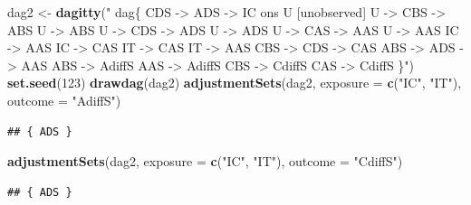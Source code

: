 \documentclass[10pt,dvipsnames,enabledeprecatedfontcommands]{scrartcl}
\newenvironment{Shaded}{\begin{snugshade}}{\end{snugshade}}
\newcommand{\DataTypeTok}[1]{\textcolor[rgb]{0.13,0.29,0.53}{#1}}
\newcommand{\DecValTok}[1]{\textcolor[rgb]{0.00,0.00,0.81}{#1}}
\newcommand{\KeywordTok}[1]{\textcolor[rgb]{0.13,0.29,0.53}{\textbf{#1}}}
\newcommand{\NormalTok}[1]{#1}
\newcommand{\StringTok}[1]{\textcolor[rgb]{0.31,0.60,0.02}{#1}}
\begin{document}
\begin{Shaded}
\begin{Highlighting}[]
\NormalTok{dag2 <-}\StringTok{ }\KeywordTok{dagitty}\NormalTok{(}\StringTok{"}
\StringTok{  dag\{}
\StringTok{                CDS -> ADS -> IC  ons}
\StringTok{                U [unobserved]   }
\StringTok{                U -> CBS -> ABS  }
\StringTok{                U -> ABS        }
\StringTok{                U -> CDS -> ADS  }
\StringTok{                U -> ADS         }
\StringTok{                U -> CAS -> AAS    }
\StringTok{                U -> AAS                        }
\StringTok{                IC -> AAS        }
\StringTok{                IC -> CAS        }
\StringTok{                IT -> CAS        }
\StringTok{                IT -> AAS}
\StringTok{                CBS -> CDS -> CAS}
\StringTok{                ABS -> ADS -> AAS}
\StringTok{                ABS -> AdiffS}
\StringTok{                AAS -> AdiffS}
\StringTok{                CBS -> CdiffS}
\StringTok{                CAS -> CdiffS}
\StringTok{                \}"}\NormalTok{)}
\KeywordTok{set.seed}\NormalTok{(}\DecValTok{123}\NormalTok{)}
\KeywordTok{drawdag}\NormalTok{(dag2)}
\KeywordTok{adjustmentSets}\NormalTok{(dag2, }\DataTypeTok{exposure =} \KeywordTok{c}\NormalTok{(}\StringTok{"IC"}\NormalTok{, }\StringTok{"IT"}\NormalTok{), }\DataTypeTok{outcome =} \StringTok{"AdiffS"}\NormalTok{)}
\end{Highlighting}
\end{Shaded}

\begin{verbatim}
## { ADS }
\end{verbatim}

\begin{Shaded}
\begin{Highlighting}[]
\KeywordTok{adjustmentSets}\NormalTok{(dag2, }\DataTypeTok{exposure =} \KeywordTok{c}\NormalTok{(}\StringTok{"IC"}\NormalTok{, }\StringTok{"IT"}\NormalTok{), }\DataTypeTok{outcome =} \StringTok{"CdiffS"}\NormalTok{)}
\end{Highlighting}
\end{Shaded}

\begin{verbatim}
## { ADS }
\end{verbatim}
\end{document}
